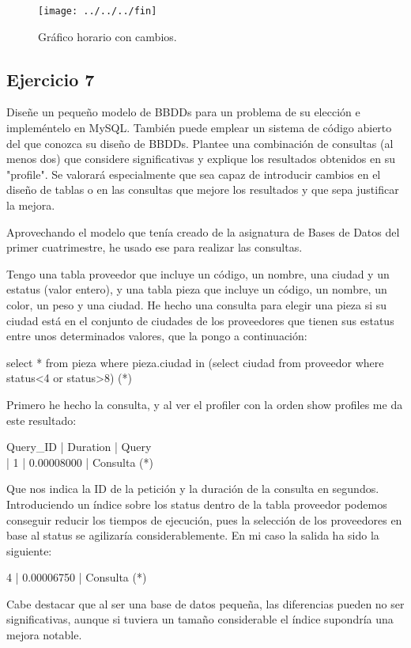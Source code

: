 \documentclass[a4paper, 11pt]{article} %
\begin{document}
\begin{figure}[htpb]
\centering
\texttt{[image: ../../../fin]}
\caption{Gráfico horario con cambios.}
\end{figure}


\subsection{Ejercicio 7}
Diseñe un pequeño modelo de BBDDs para un problema de su elección e impleméntelo en MySQL. También puede emplear un sistema de código abierto del que conozca su diseño de BBDDs. Plantee una combinación de consultas (al menos dos) que considere significativas y explique los resultados obtenidos en su "profile". Se valorará especialmente que sea capaz de introducir cambios en el diseño de tablas o en las consultas que mejore los resultados y que sepa justificar la mejora. 

Aprovechando el modelo que tenía creado de la asignatura de Bases de Datos del primer cuatrimestre, he usado ese para realizar las consultas. 

Tengo una tabla proveedor que incluye un código, un nombre, una ciudad y un estatus (valor entero), y una tabla pieza que incluye un código, un nombre, un color, un peso y una ciudad. He hecho una consulta para elegir una pieza si su ciudad está en el conjunto de ciudades de los proveedores que tienen sus estatus entre unos determinados valores, que la pongo a continuación: 

select * from pieza where pieza.ciudad in (select ciudad from proveedor where status<4 or status>8) (*)

Primero he hecho la consulta, y al ver el profiler con la orden show profiles me da este resultado: 

 Query\_ID | Duration   | Query \\
 |        1 | 0.00008000 | Consulta (*)
 
Que nos indica la ID de la petición y la duración de la consulta en segundos. Introduciendo un índice sobre los status dentro de la tabla proveedor podemos conseguir reducir los tiempos de ejecución, pues la selección de los proveedores en base al status se agilizaría considerablemente. En mi caso la salida ha sido la siguiente: 

 4 | 0.00006750 | Consulta (*)

Cabe destacar que al ser una base de datos pequeña, las diferencias pueden no ser significativas, aunque si tuviera un tamaño considerable el índice supondría una mejora notable. 
\end{document}
